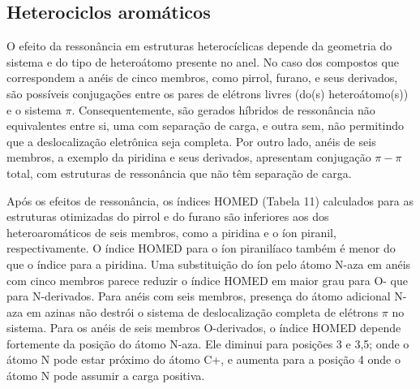 \subsection{Heterociclos aromáticos}

O efeito da ressonância em estruturas heterocíclicas depende da geometria do sistema e do tipo de heteroátomo presente no anel. No caso dos compostos que correspondem a anéis de cinco membros, como pirrol, furano, e seus derivados, são possíveis conjugações entre os pares de elétrons livres (do(s) heteroátomo(s)) e o sistema $\pi$. Consequentemente, são gerados híbridos de ressonância não equivalentes entre si, uma com separação de carga, e outra sem, não permitindo que a deslocalização eletrônica seja completa. Por outro lado, anéis de seis membros, a exemplo da piridina e seus derivados, apresentam conjugação $\pi-\pi$ total, com estruturas de ressonância que não têm separação de carga.

Após os efeitos de ressonância, os índices \gls{HOMED} (Tabela 11) calculados para as estruturas otimizadas do pirrol e do furano são inferiores aos dos heteroaromáticos de seis membros, como a piridina e o íon piranil, respectivamente. O índice \gls{HOMED} para o íon piranilíaco também é menor do que o índice para a piridina. Uma substituição do íon  pelo átomo N-aza em anéis com cinco membros parece reduzir o índice \gls{HOMED} em maior grau para O- que para N-derivados. Para anéis com seis membros, presença do átomo adicional N-aza em azinas não destrói o sistema de deslocalização completa de elétrons $\pi$ no sistema. Para os anéis de seis membros O-derivados, o índice \gls{HOMED} depende fortemente da posição do átomo N-aza. Ele diminui para posições 3 e 3,5; onde o átomo N pode estar próximo do átomo C+, e aumenta para a posição 4 onde o átomo N pode assumir a carga positiva.